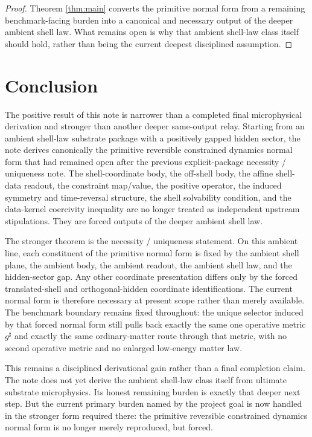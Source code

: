 \documentclass[11pt]{article}
\newcommand{\CompletedMetric}{g^{\sharp}}
\begin{document}
\begin{proof}
Theorem \ref{thm:main} converts the primitive normal form from a remaining benchmark-facing burden into a canonical and necessary output of the deeper ambient shell law. What remains open is why that ambient shell-law class itself should hold, rather than being the current deepest disciplined assumption.
\end{proof}

\section{Conclusion}

The positive result of this note is narrower than a completed final microphysical derivation and stronger than another deeper same-output relay. Starting from an ambient shell-law substrate package with a positively gapped hidden sector, the note derives canonically the primitive reversible constrained dynamics normal form that had remained open after the previous explicit-package necessity / uniqueness note. The shell-coordinate body, the off-shell body, the affine shell-data readout, the constraint map/value, the positive operator, the induced symmetry and time-reversal structure, the shell solvability condition, and the data-kernel coercivity inequality are no longer treated as independent upstream stipulations. They are forced outputs of the deeper ambient shell law.

The stronger theorem is the necessity / uniqueness statement. On this ambient line, each constituent of the primitive normal form is fixed by the ambient shell plane, the ambient body, the ambient readout, the ambient shell law, and the hidden-sector gap. Any other coordinate presentation differs only by the forced translated-shell and orthogonal-hidden coordinate identifications. The current normal form is therefore necessary at present scope rather than merely available. The benchmark boundary remains fixed throughout: the unique selector induced by that forced normal form still pulls back exactly the same one operative metric \(\CompletedMetric\) and exactly the same ordinary-matter route through that metric, with no second operative metric and no enlarged low-energy matter law.

This remains a disciplined derivational gain rather than a final completion claim. The note does not yet derive the ambient shell-law class itself from ultimate substrate microphysics. Its honest remaining burden is exactly that deeper next step. But the current primary burden named by the project goal is now handled in the stronger form required there: the primitive reversible constrained dynamics normal form is no longer merely reproduced, but forced.
\end{document}
